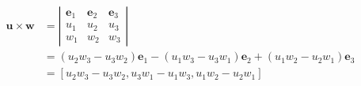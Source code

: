 \documentclass[10pt]{article}
\begin{document}
\begin{enumerate}
$$
\begin{aligned}
\mathbf{u} \times \mathbf{w} & =\left|\begin{array}{ccc}
\mathbf{e}_{1} & \mathbf{e}_{2} & \mathbf{e}_{3} \\
u_{1} & u_{2} & u_{3} \\
w_{1} & w_{2} & w_{3}
\end{array}\right| \\
& =\left(u_{2} w_{3}-u_{3} w_{2}\right) \mathbf{e}_{1}-\left(u_{1} w_{3}-u_{3} w_{1}\right) \mathbf{e}_{2}+\left(u_{1} w_{2}-u_{2} w_{1}\right) \mathbf{e}_{3} \\
& =\left[u_{2} w_{3}-u_{3} w_{2}, u_{3} w_{1}-u_{1} w_{3}, u_{1} w_{2}-u_{2} w_{1}\right]
\end{aligned}
$$

\end{enumerate}



\newpage
\end{document}
